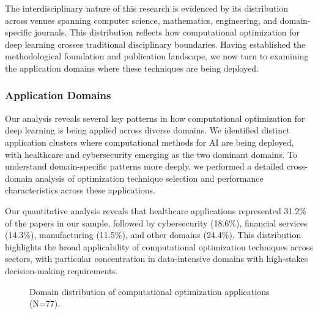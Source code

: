 \documentclass[12pt]{acm/acmart}
\begin{document}
The interdisciplinary nature of this research is evidenced by its distribution across venues spanning computer science, mathematics, engineering, and domain-specific journals. This distribution reflects how computational optimization for deep learning crosses traditional disciplinary boundaries. Having established the methodological foundation and publication landscape, we now turn to examining the application domains where these techniques are being deployed.

\subsubsection{Application Domains}\label{subsubsec:overview-of-included-studies:application-domains}
Our analysis reveals several key patterns in how computational optimization for deep learning is being applied across diverse domains. We identified distinct application clusters where computational methods for AI are being deployed, with healthcare and cybersecurity emerging as the two dominant domains. To understand domain-specific patterns more deeply, we performed a detailed cross-domain analysis of optimization technique selection and performance characteristics across these applications.

Our quantitative analysis reveals that healthcare applications represented 31.2\% of the papers in our sample, followed by cybersecurity (18.6\%), financial services (14.3\%), manufacturing (11.5\%), and other domains (24.4\%). This distribution highlights the broad applicability of computational optimization techniques across sectors, with particular concentration in data-intensive domains with high-stakes decision-making requirements.

\begin{figure}[ht]
    \centering
    \caption{Domain distribution of computational optimization applications (N=77).}
    \label{fig:domain_distribution}
\end{figure}
\end{document}
